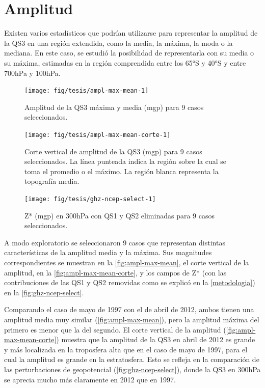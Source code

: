 \documentclass[spanish,a4paper,12pt,oneside]{book}
\begin{document}
\hypertarget{amplitud}{%
\section{Amplitud}\label{amplitud}}

Existen varios estadísticos que podrían utilizarse para representar la
amplitud de la QS3 en una región extendida, como la media, la máxima, la
moda o la mediana. En este caso, se estudió la posibilidad de
representarla con su media o su máxima, estimadas en la región
comprendida entre los 65°S y 40°S y entre 700hPa y 100hPa.

\begin{figure}
\texttt{[image: fig/tesis/ampl-max-mean-1]} \caption{Amplitud de la QS3 máxima y media (mgp) para 9 casos seleccionados.}\label{fig:ampl-max-mean}
\end{figure}

\begin{figure}
\texttt{[image: fig/tesis/ampl-max-mean-corte-1]} \caption{Corte vertical de amplitud de la QS3 (mgp) para 9 casos seleccionados. La línea punteada indica la región sobre la cual se toma el promedio o el máximo. La región blanca representa la topografía media.}\label{fig:ampl-max-mean-corte}
\end{figure}

\begin{figure}
\texttt{[image: fig/tesis/ghz-ncep-select-1]} \caption{Z* (mgp) en 300hPa con QS1 y QS2 eliminadas para 9 casos seleccionados.}\label{fig:ghz-ncep-select}
\end{figure}

A modo exploratorio se seleccionaron 9 casos que representan distintas
características de la amplitud media y la máxima. Sus magnitudes
correspondientes se muestran en la \autoref{fig:ampl-max-mean}, el corte
vertical de la amplitud, en la \autoref{fig:ampl-max-mean-corte}, y los
campos de Z* (con las contribuciones de las QS1 y QS2 removidas como se
explicó en la \autoref{metodologia}) en la
\autoref{fig:ghz-ncep-select}.

Comparando el caso de mayo de 1997 con el de abril de 2012, ambos tienen
una amplitud media muy similar (\autoref{fig:ampl-max-mean}), pero la
amplitud máxima del primero es menor que la del segundo. El corte
vertical de la amplitud (\autoref{fig:ampl-max-mean-corte}) muestra que
la amplitud de la QS3 en abril de 2012 es grande y más localizada en la
troposfera alta que en el caso de mayo de 1997, para el cual la amplitud
es grande en la estratosfera. Esto se refleja en la comparación de las
perturbaciones de geopotencial (\autoref{fig:ghz-ncep-select}), donde la
QS3 en 300hPa se aprecia mucho más claramente en 2012 que en 1997.
\end{document}
